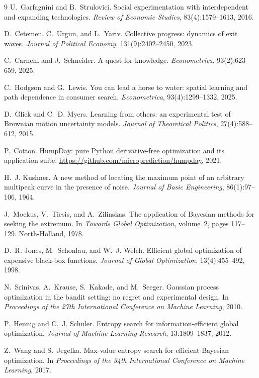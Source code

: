 \documentclass[11pt]{article}
\theoremstyle{itheads}
\begin{document}
\begin{thebibliography}{9}
U.~Garfagnini and B.~Strulovici.
Social experimentation with interdependent and expanding
technologies.
\emph{Review of Economic Studies}, 83(4):1579--1613, 2016.

D.~Cetemen, C.~Urgun, and L.~Yariv.
Collective progress: dynamics of exit waves.
\emph{Journal of Political Economy}, 131(9):2402--2450, 2023.

C.~Carnehl and J.~Schneider.
A quest for knowledge.
\emph{Econometrica}, 93(2):623--659, 2025.

C.~Hodgson and G.~Lewis.
You can lead a horse to water: spatial learning and path dependence
in consumer search.
\emph{Econometrica}, 93(4):1299--1332, 2025.

D.~Glick and C.~D. Myers.
Learning from others: an experimental test of Brownian motion
uncertainty models.
\emph{Journal of Theoretical Politics}, 27(4):588--612, 2015.

P.~Cotton.
HumpDay: pure Python derivative-free optimization and its application
suite.
\url{https://github.com/microprediction/humpday}, 2021.

H.~J. Kushner.
A new method of locating the maximum point of an arbitrary multipeak
curve in the presence of noise.
\emph{Journal of Basic Engineering}, 86(1):97--106, 1964.

J.~Mockus, V.~Tiesis, and A.~Zilinskas.
The application of Bayesian methods for seeking the extremum.
In \emph{Towards Global Optimization}, volume~2, pages 117--129.
North-Holland, 1978.

D.~R. Jones, M.~Schonlau, and W.~J. Welch.
Efficient global optimization of expensive black-box functions.
\emph{Journal of Global Optimization}, 13(4):455--492, 1998.

N.~Srinivas, A.~Krause, S.~Kakade, and M.~Seeger.
Gaussian process optimization in the bandit setting: no regret and
experimental design.
In \emph{Proceedings of the 27th International Conference on Machine
Learning}, 2010.

P.~Hennig and C.~J. Schuler.
Entropy search for information-efficient global optimization.
\emph{Journal of Machine Learning Research}, 13:1809--1837, 2012.

Z.~Wang and S.~Jegelka.
Max-value entropy search for efficient Bayesian optimization.
In \emph{Proceedings of the 34th International Conference on Machine
Learning}, 2017.


\end{thebibliography}
\end{document}
